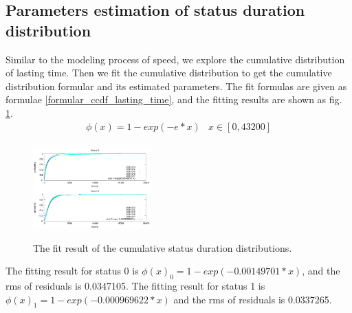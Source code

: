 \subsection{Parameters estimation of status duration distribution}
\label{section_lasting_time_modeling}
Similar to the modeling process of speed, we explore the cumulative distribution of lasting time. Then we fit the cumulative distribution to get the cumulative distribution formular and its estimated parameters.
The fit formulas are given as formulae \ref{formular_ccdf_lasting_time}, and the fitting results are shown as  fig. \ref{figure_fit_ccdf_lasting_time}.
\begin{equation}\label{formular_ccdf_lasting_time}
\begin{array}{ll}
 \phi(x)=1-exp(-e*x)& x\in [0,43200]\\
\end{array}
\end{equation}

\begin{figure}[htbp]
\centering
\includegraphics[width=0.4\textwidth]{figures_201103/CCDF_LastingTime.eps}\\
\caption{The fit result of the cumulative status duration distributions.}\label{figure_fit_ccdf_lasting_time}
\end{figure}


The fitting result for status 0 is $\phi(x)_0=1-exp(-0.00149701*x)$, and the rms of residuals is 0.0347105. The fitting result for status 1 is $\phi(x)_1=1-exp(-0.000969622 *x)$  and the rms of residuals is 0.0337265. 